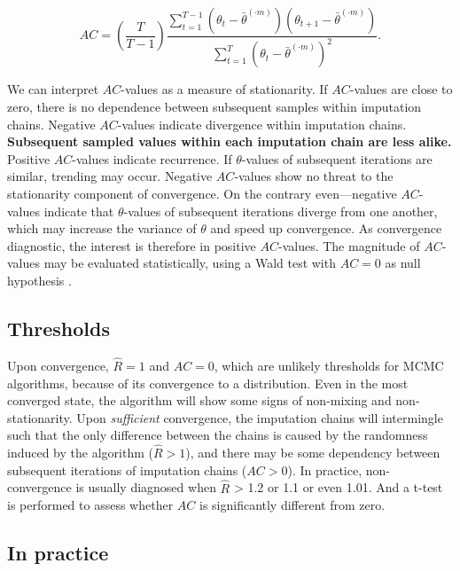 \documentclass[Royal,times,sageh]{sagej}
\begin{document}
\begin{equation*}
AC = \left( \frac{T}{T-1} \right) \frac{\sum_{t=1}^{T-1}(\theta_t - \bar{\theta}^{(\cdot m)})(\theta_{t+1} - \bar{\theta}^{(\cdot m)})}{\sum_{t=1}^{T}(\theta_t - \bar{\theta}^{(\cdot m)})^2}.
\end{equation*}

We can interpret \(AC\)-values as a measure of stationarity. If \(AC\)-values are close to zero, there is no dependence between subsequent samples within imputation chains. Negative \(AC\)-values indicate divergence within imputation chains. \textbf{Subsequent sampled values within each imputation chain are less alike.} Positive \(AC\)-values indicate recurrence. If \(\theta\)-values of subsequent iterations are similar, trending may occur. Negative \(AC\)-values show no threat to the stationarity component of convergence. On the contrary even---negative \(AC\)-values indicate that \(\theta\)-values of subsequent iterations diverge from one another, which may increase the variance of \(\theta\) and speed up convergence. As convergence diagnostic, the interest is therefore in positive \(AC\)-values. The magnitude of \(AC\)-values may be evaluated statistically, using a Wald test with \(AC=0\) as null hypothesis \citep{box15}.

\hypertarget{thresholds}{%
\subsection{Thresholds}\label{thresholds}}

Upon convergence, \(\widehat{R}=1\) and \(AC=0\), which are unlikely thresholds for MCMC algorithms, because of its convergence to a distribution. Even in the most converged state, the algorithm will show some signs of non-mixing and non-stationarity. Upon \emph{sufficient} convergence, the imputation chains will intermingle such that the only difference between the chains is caused by the randomness induced by the algorithm (\(\widehat{R} > 1\)), and there may be some dependency between subsequent iterations of imputation chains (\(AC > 0\)). In practice, non-convergence is usually diagnosed when \(\widehat{R}\) \textgreater{} 1.2 or 1.1 or even 1.01. And a t-test is performed to assess whether \(AC\) is significantly different from zero.

\hypertarget{in-practice}{%
\subsection{In practice}\label{in-practice}}
\end{document}

